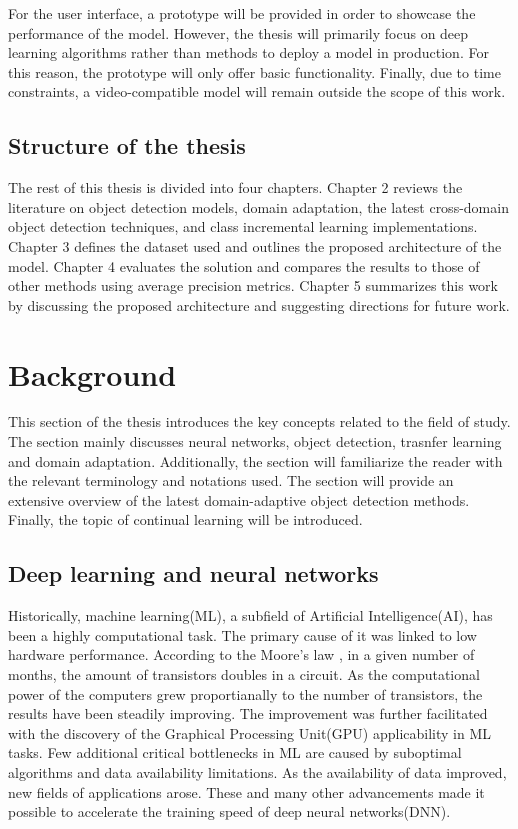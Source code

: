 \documentclass[english, 12pt, a4paper, elec, utf8, a-1b, online]{aaltothesis}
\begin{document}
For the user interface, a prototype will be provided in order to showcase the performance of the model. However, the thesis will primarily focus on deep learning algorithms rather than methods to deploy a model in production. For this reason, the prototype will only offer basic functionality. Finally, due to time constraints, a video-compatible model will remain outside the scope of this work. 

 

\subsection{Structure of the thesis}
The rest of this thesis is divided into four chapters. Chapter 2 reviews the literature on object detection models, domain adaptation, the latest cross-domain object detection techniques, and class incremental learning implementations. Chapter 3 defines the dataset used and outlines the proposed architecture of the model. Chapter 4 evaluates the solution and compares the results to those of other methods using average precision metrics. Chapter 5 summarizes this work by discussing the proposed architecture and suggesting directions for future work.

\clearpage
\section{Background}
This section of the thesis introduces the key concepts related to the field of study. The section mainly discusses neural networks, object detection, trasnfer learning and domain adaptation. Additionally, the section will familiarize the reader with the relevant terminology and notations used. The section will provide an extensive overview of the latest domain-adaptive object detection methods. Finally, the topic of  continual learning will be introduced. 
\subsection{Deep learning and neural networks}
Historically, machine learning(ML), a subfield of Artificial Intelligence(AI), has been a highly computational task. The primary cause of it was linked to low hardware performance. According to the Moore's law \cite{Etiemble2022}, in a given number of months, the amount of transistors doubles in a circuit.  As the computational power of the computers grew proportianally to the number of transistors, the results have been steadily improving. The improvement was further facilitated with the discovery of the Graphical Processing Unit(GPU) applicability in ML tasks.\cite{Hwang2018} Few additional critical bottlenecks in ML are caused by suboptimal algorithms and data availability limitations. As the availability of data improved, new fields of applications arose. These and many other advancements made it possible to accelerate the training speed of deep neural networks(DNN).  
\end{document}
